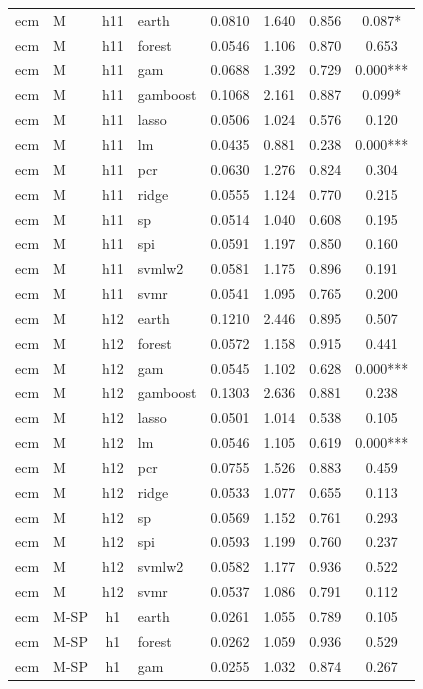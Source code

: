\begin{ThreePartTable}
\begin{longtable}[t]{llclcccc}
\addlinespace
ecm & M & h11 & earth & 0.0810 & 1.640 & 0.856 & 0.087*\\
ecm & M & h11 & forest & 0.0546 & 1.106 & 0.870 & 0.653\\
ecm & M & h11 & gam & 0.0688 & 1.392 & 0.729 & 0.000***\\
ecm & M & h11 & gamboost & 0.1068 & 2.161 & 0.887 & 0.099*\\
ecm & M & h11 & lasso & 0.0506 & 1.024 & 0.576 & 0.120\\
ecm & M & h11 & lm & 0.0435 & 0.881 & 0.238 & 0.000***\\
ecm & M & h11 & pcr & 0.0630 & 1.276 & 0.824 & 0.304\\
ecm & M & h11 & ridge & 0.0555 & 1.124 & 0.770 & 0.215\\
ecm & M & h11 & sp & 0.0514 & 1.040 & 0.608 & 0.195\\
ecm & M & h11 & spi & 0.0591 & 1.197 & 0.850 & 0.160\\
ecm & M & h11 & svmlw2 & 0.0581 & 1.175 & 0.896 & 0.191\\
ecm & M & h11 & svmr & 0.0541 & 1.095 & 0.765 & 0.200\\
\addlinespace
ecm & M & h12 & earth & 0.1210 & 2.446 & 0.895 & 0.507\\
ecm & M & h12 & forest & 0.0572 & 1.158 & 0.915 & 0.441\\
ecm & M & h12 & gam & 0.0545 & 1.102 & 0.628 & 0.000***\\
ecm & M & h12 & gamboost & 0.1303 & 2.636 & 0.881 & 0.238\\
ecm & M & h12 & lasso & 0.0501 & 1.014 & 0.538 & 0.105\\
ecm & M & h12 & lm & 0.0546 & 1.105 & 0.619 & 0.000***\\
ecm & M & h12 & pcr & 0.0755 & 1.526 & 0.883 & 0.459\\
ecm & M & h12 & ridge & 0.0533 & 1.077 & 0.655 & 0.113\\
ecm & M & h12 & sp & 0.0569 & 1.152 & 0.761 & 0.293\\
ecm & M & h12 & spi & 0.0593 & 1.199 & 0.760 & 0.237\\
ecm & M & h12 & svmlw2 & 0.0582 & 1.177 & 0.936 & 0.522\\
ecm & M & h12 & svmr & 0.0537 & 1.086 & 0.791 & 0.112\\
\addlinespace
ecm & M-SP & h1 & earth & 0.0261 & 1.055 & 0.789 & 0.105\\
ecm & M-SP & h1 & forest & 0.0262 & 1.059 & 0.936 & 0.529\\
ecm & M-SP & h1 & gam & 0.0255 & 1.032 & 0.874 & 0.267\\

\end{longtable}
\end{ThreePartTable}
